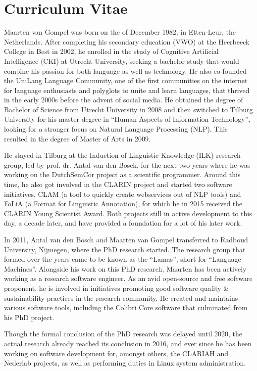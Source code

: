 \chapter*{Curriculum Vitae}

Maarten van Gompel was born on the  of December 1982, in Etten-Leur,
the Netherlands. After completing his secondary education (VWO) at the
Heerbeeck College in Best in 2002, he enrolled in the study of
Cognitive Artificial Intelligence (CKI) at Utrecht University,
seeking a bachelor study that would combine his
passion for both language as well as technology. He also
co-founded the UniLang Language Community, one of the first communities on the
internet for language enthusiasts and polyglots to unite and learn languages,
that thrived in the early 2000s before the advent of social media. He obtained
the degree of Bachelor of Science from Utrecht University in 2008 and then
switched to Tilburg University for his master degree in ``Human Aspects of
Information Technology'', looking for a stronger focus on Natural Language
Processing (NLP).  This resulted in the degree of Master of Arts in 2009.

He stayed in Tilburg at the Induction of Linguistic Knowledge (ILK) research
group, led by prof. dr. Antal van den Bosch, for the next two years where he was working on
the DutchSemCor project as a scientific programmer. Around this time, he also
got involved in the CLARIN project and started two software
initiatives, CLAM (a tool to quickly create webservices out of NLP tools) and
FoLiA (a Format for Linguistic Annotation), for which he in 2015 received the CLARIN Young Scientist Award. Both projects
still in active development to this day, a decade later, and have provided a foundation for a lot of his later work.

In 2011, Antal van den Bosch and Maarten van Gompel transferred to Radboud
University, Nijmegen, where the PhD research started. The research group that
formed over the years came to be known as the ``Lamas'', short for ``Language
Machines''.  Alongside his work on this PhD research, Maarten has been actively
working as a research software engineer. As an avid open-source and free
software proponent, he is involved in initiatives promoting good software
quality \& sustainability practices in the research community. He created and
maintains various software tools, including the Colibri Core software that
culminated from his PhD project.

Though the formal conclusion of the PhD research was delayed until 2020, the
actual research already reached its conclusion in 2016, and ever since he has
been working on software development for, amongst others, the CLARIAH and
Nederlab projects, as well as performing duties in Linux system administration.
